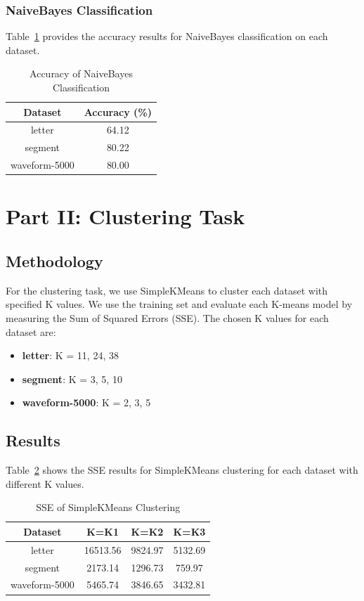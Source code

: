 \documentclass{article}
\begin{document}
\subsubsection{NaiveBayes Classification}
Table~\ref{tab:naivebayes-results} provides the accuracy results for NaiveBayes classification on each dataset.

\begin{table}[H]
    \centering
    \caption{Accuracy of NaiveBayes Classification}
    \label{tab:naivebayes-results}
    \begin{tabular}{|c|c|}
        \hline
        \textbf{Dataset} & \textbf{Accuracy (\%)} \\
        \hline
        letter & 64.12 \\
        \hline
        segment & 80.22 \\
        \hline
        waveform-5000 & 80.00 \\
        \hline
    \end{tabular}
\end{table}

\newpage

\section{Part II: Clustering Task}

\subsection{Methodology}
For the clustering task, we use SimpleKMeans to cluster each dataset with specified K values. We use the training set and evaluate each K-means model by measuring the Sum of Squared Errors (SSE). The chosen K values for each dataset are:
\begin{itemize}
    \item \textbf{letter}: K = 11, 24, 38
    \item \textbf{segment}: K = 3, 5, 10
    \item \textbf{waveform-5000}: K = 2, 3, 5
\end{itemize}

\subsection{Results}
Table~\ref{tab:kmeans-sse-results} shows the SSE results for SimpleKMeans clustering for each dataset with different K values.

\begin{table}[H]
    \centering
    \caption{SSE of SimpleKMeans Clustering}
    \label{tab:kmeans-sse-results}
    \begin{tabular}{|c|c|c|c|}
        \hline
        \textbf{Dataset} & \textbf{K=K1} & \textbf{K=K2} & \textbf{K=K3} \\
        \hline
        letter & 16513.56 & 9824.97 & 5132.69 \\
        \hline
        segment & 2173.14 & 1296.73 & 759.97 \\
        \hline
        waveform-5000 & 5465.74 &3846.65 & 3432.81 \\
        \hline
    \end{tabular}
\end{table}
\end{document}
